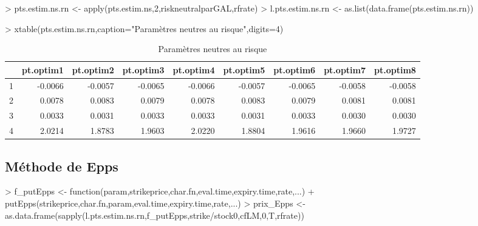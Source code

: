 \documentclass[letter]{report}
\begin{document}
\begin{Schunk}
\begin{Sinput}
> pts.estim.ns.rn <- apply(pts.estim.ns,2,riskneutralparGAL,rfrate)
> l.pts.estim.ns.rn <- as.list(data.frame(pts.estim.ns.rn))
\end{Sinput}
\end{Schunk}

\begin{Schunk}
\begin{Sinput}
> xtable(pts.estim.ns.rn,caption="Paramètres neutres au risque",digits=4)
\end{Sinput}
% latex table generated in R 3.1.0 by xtable 1.7-3 package
% Sat May 24 10:56:20 2014
\begin{table}[ht]
\centering
\begin{tabular}{rrrrrrrrr}
  \hline
 & pt.optim1 & pt.optim2 & pt.optim3 & pt.optim4 & pt.optim5 & pt.optim6 & pt.optim7 & pt.optim8 \\ 
  \hline
1 & -0.0066 & -0.0057 & -0.0065 & -0.0066 & -0.0057 & -0.0065 & -0.0058 & -0.0058 \\ 
  2 & 0.0078 & 0.0083 & 0.0079 & 0.0078 & 0.0083 & 0.0079 & 0.0081 & 0.0081 \\ 
  3 & 0.0033 & 0.0031 & 0.0033 & 0.0033 & 0.0031 & 0.0033 & 0.0030 & 0.0030 \\ 
  4 & 2.0214 & 1.8783 & 1.9603 & 2.0220 & 1.8804 & 1.9616 & 1.9660 & 1.9727 \\ 
   \hline
\end{tabular}
\caption{Paramètres neutres au risque} 
\end{table}\end{Schunk}


\subsection{Méthode de Epps}

\begin{Schunk}
\begin{Sinput}
> 	f_putEpps <- function(param,strikeprice,char.fn,eval.time,expiry.time,rate,...)
+ 		putEpps(strikeprice,char.fn,param,eval.time,expiry.time,rate,...)
> 	prix_Epps <- as.data.frame(sapply(l.pts.estim.ns.rn,f_putEpps,strike/stock0,cfLM,0,T,rfrate))
\end{Sinput}
\end{Schunk}
\end{document}
